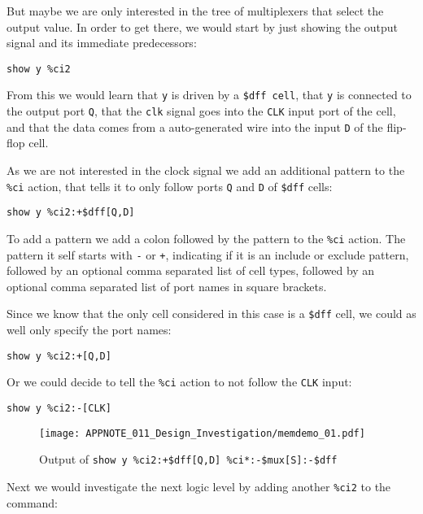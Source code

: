 \documentclass[9pt,technote,a4paper]{IEEEtran}
\begin{document}
But maybe we are only interested in the tree of multiplexers that select the
output value. In order to get there, we would start by just showing the output signal
and its immediate predecessors:

\begin{verbatim}
show y %ci2
\end{verbatim}

From this we would learn that {\tt y} is driven by a {\tt \$dff cell}, that
{\tt y} is connected to the output port {\tt Q}, that the {\tt clk} signal goes
into the {\tt CLK} input port of the cell, and that the data comes from a
auto-generated wire into the input {\tt D} of the flip-flop cell.

As we are not interested in the clock signal we add an additional pattern to the {\tt \%ci}
action, that tells it to only follow ports {\tt Q} and {\tt D} of {\tt \$dff} cells:

\begin{verbatim}
show y %ci2:+$dff[Q,D]
\end{verbatim}

To add a pattern we add a colon followed by the pattern to the {\tt \%ci}
action. The pattern it self starts with {\tt -} or {\tt +}, indicating if it is
an include or exclude pattern, followed by an optional comma separated list
of cell types, followed by an optional comma separated list of port names in
square brackets.

Since we know that the only cell considered in this case is a {\tt \$dff} cell,
we could as well only specify the port names:

\begin{verbatim}
show y %ci2:+[Q,D]
\end{verbatim}

Or we could decide to tell the {\tt \%ci} action to not follow the {\tt CLK} input:

\begin{verbatim}
show y %ci2:-[CLK]
\end{verbatim}

\begin{figure}[b]
\texttt{[image: APPNOTE\_011\_Design\_Investigation/memdemo\_01.pdf]} \\
\caption{Output of {\tt show y \%ci2:+\$dff[Q,D] \%ci*:-\$mux[S]:-\$dff}}
\label{memdemo_01}
\end{figure}

Next we would investigate the next logic level by adding another {\tt \%ci2} to
the command:
\end{document}
